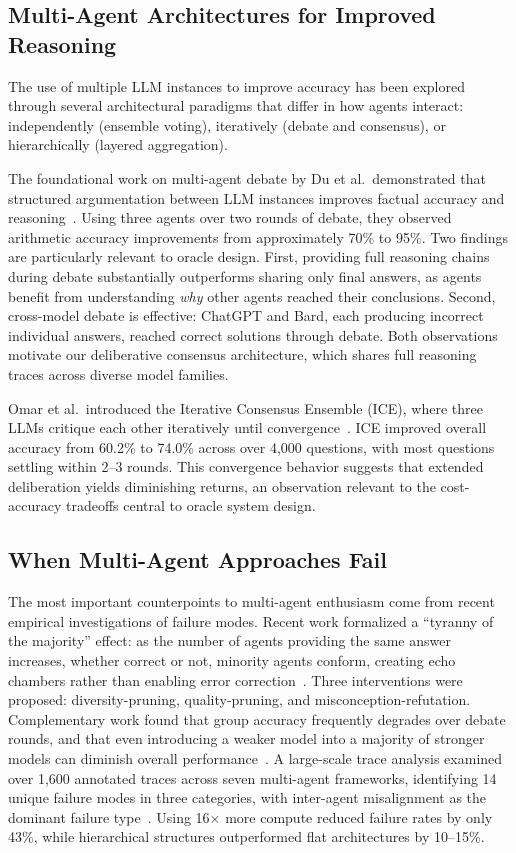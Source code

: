 \subsection{Multi-Agent Architectures for Improved Reasoning}

The use of multiple LLM instances to improve accuracy has been explored through
several architectural paradigms that differ in how agents interact: independently
(ensemble voting), iteratively (debate and consensus), or hierarchically (layered
aggregation).

The foundational work on multi-agent debate by Du et al.\ demonstrated that
structured argumentation between LLM instances improves factual accuracy and
reasoning~\cite{du2023debate}. Using three agents over two rounds of debate, they
observed arithmetic accuracy improvements from approximately 70\% to 95\%. Two
findings are particularly relevant to oracle design. First, providing full reasoning
chains during debate substantially outperforms sharing only final answers, as agents
benefit from understanding \emph{why} other agents reached their conclusions. Second,
cross-model debate is effective: ChatGPT and Bard, each producing incorrect
individual answers, reached correct solutions through debate. Both observations
motivate our deliberative consensus architecture, which shares full reasoning traces
across diverse model families.

Omar et al.\ introduced the Iterative Consensus Ensemble (ICE), where three LLMs
critique each other iteratively until convergence~\cite{omar2025ice}. ICE improved
overall accuracy from 60.2\% to 74.0\% across over 4,000 questions, with most
questions settling within 2--3 rounds. This convergence behavior suggests that
extended deliberation yields diminishing returns, an observation relevant to the
cost-accuracy tradeoffs central to oracle system design.


\subsection{When Multi-Agent Approaches Fail}
The most important counterpoints to multi-agent enthusiasm come from recent empirical investigations of failure modes. Recent work formalized a ``tyranny of the majority'' effect: as the number of agents providing the same answer increases, whether correct or not, minority agents conform, creating echo chambers rather than enabling error correction~\cite{estornell2024tyranny}. Three interventions were proposed: diversity-pruning, quality-pruning, and misconception-refutation. Complementary work found that group accuracy frequently degrades over debate rounds, and that even introducing a weaker model into a majority of stronger models can diminish overall performance~\cite{talkisntcheap2025}. A large-scale trace analysis examined over 1,600 annotated traces across seven multi-agent frameworks, identifying 14 unique failure modes in three categories, with inter-agent misalignment as the dominant failure type~\cite{cemri2025multiagent}. Using 16$\times$ more compute reduced failure rates by only 43\%, while hierarchical structures outperformed flat architectures by 10--15\%.


